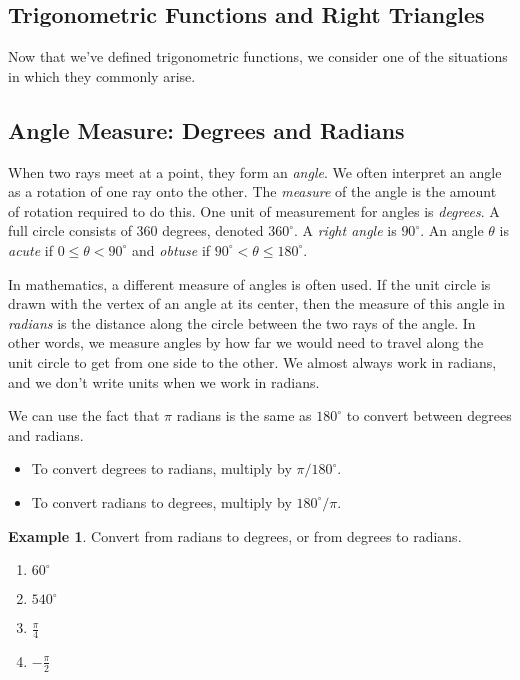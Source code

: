 \documentclass[letterpaper,12pt,oneside]{book}
\theoremstyle{definition}
\newtheorem{example}[theorem]{Example}
\begin{document}
{\newpage

\subsection*{Trigonometric Functions and Right Triangles}

Now that we've defined trigonometric functions, we consider one of the situations in which they commonly arise.

\subsection*{Angle Measure: Degrees and Radians}

When two rays meet at a point, they form an \emph{angle}.  We often interpret an angle as a rotation of one ray onto the other.  The \emph{measure} of the angle is the amount of rotation required to do this.  One unit of measurement for angles is \emph{degrees}.  A full circle consists of $360$ degrees, denoted $360^\circ$.  A \emph{right angle} is $90^\circ$.  An angle $\theta$ is \emph{acute} if $0\leq \theta<90^\circ$ and \emph{obtuse} if $90^\circ<\theta\leq 180^\circ$.

In mathematics, a different measure of angles is often used.  If the unit circle is drawn with the vertex of an angle at its center, then the measure of this angle in \emph{radians} is the distance along the circle between the two rays of the angle.  In other words, we measure angles by how far we would need to travel along the unit circle to get from one side to the other.  We almost always work in radians, and we don't write units when we work in radians.

We can use the fact that $\pi$ radians is the same as $180^\circ$ to convert between degrees and radians.
\begin{itemize}
\item To convert degrees to radians, multiply by $\pi/180^\circ$.

\item To convert radians to degrees, multiply by $180^\circ/\pi$.
\end{itemize}

\begin{example}
Convert from radians to degrees, or from degrees to radians.
\begin{multicols}{2}
\begin{enumerate}
\item $60^\circ$
\vspace{0.5cm}
\item $540^\circ$
\vspace{0.5cm}
\item $\tfrac{\pi}{4}$
\vspace{0.5cm}
\item $-\tfrac{\pi}{2}$
\vspace{0.5cm}
\end{enumerate}
\end{multicols}
\end{example}

}
\end{document}
